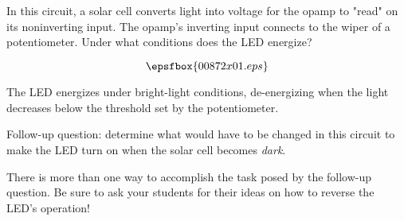 

In this circuit, a solar cell converts light into voltage for the opamp to "read" on its noninverting input.  The opamp's inverting input connects to the wiper of a potentiometer.  Under what conditions does the LED energize?

$$\epsfbox{00872x01.eps}$$







The LED energizes under bright-light conditions, de-energizing when the light decreases below the threshold set by the potentiometer.

\vskip 10pt

Follow-up question: determine what would have to be changed in this circuit to make the LED turn on when the solar cell becomes {\it dark}.







There is more than one way to accomplish the task posed by the follow-up question.  Be sure to ask your students for their ideas on how to reverse the LED's operation!




